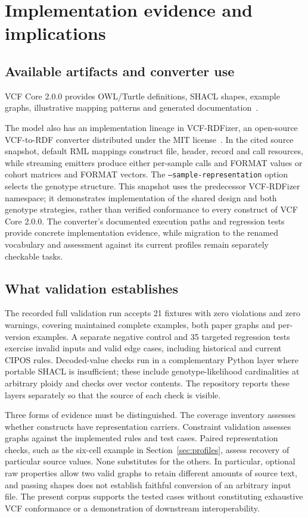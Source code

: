 \documentclass{ceurart}
\newcommand{\term}[1]{\texttt{#1}}
\begin{document}
\section{Implementation evidence and implications}
\label{sec:implementation}

\subsection{Available artifacts and converter use}

VCF Core 2.0.0 provides OWL/Turtle definitions, SHACL shapes, example graphs, illustrative mapping patterns and generated documentation~\cite{vcfc200}.

The model also has an implementation lineage in VCF-RDFizer, an open-source VCF-to-RDF converter distributed under the MIT license~\cite{vcfrConverter2026}. In the cited source snapshot, default RML mappings construct file, header, record and call resources, while streaming emitters produce either per-sample calls and FORMAT values or cohort matrices and FORMAT vectors. The \term{--sample-representation} option selects the genotype structure. This snapshot uses the predecessor VCF-RDFizer namespace; it demonstrates implementation of the shared design and both genotype strategies, rather than verified conformance to every construct of VCF Core 2.0.0. The converter's documented execution paths and regression tests provide concrete implementation evidence, while migration to the renamed vocabulary and assessment against its current profiles remain separately checkable tasks.

\subsection{What validation establishes}

The recorded full validation run accepts 21 fixtures with zero violations and zero warnings, covering maintained complete examples, both paper graphs and per-version examples. A separate negative control and 35 targeted regression tests exercise invalid inputs and valid edge cases, including historical and current CIPOS rules. Decoded-value checks run in a complementary Python layer where portable SHACL is insufficient; these include genotype-likelihood cardinalities at arbitrary ploidy and checks over vector contents. The repository reports these layers separately so that the source of each check is visible.

Three forms of evidence must be distinguished. The coverage inventory assesses whether constructs have representation carriers. Constraint validation assesses graphs against the implemented rules and test cases. Paired representation checks, such as the six-cell example in Section~\ref{sec:profiles}, assess recovery of particular source values. None substitutes for the others. In particular, optional raw properties allow two valid graphs to retain different amounts of source text, and passing shapes does not establish faithful conversion of an arbitrary input file. The present corpus supports the tested cases without constituting exhaustive VCF conformance or a demonstration of downstream interoperability.
\end{document}
